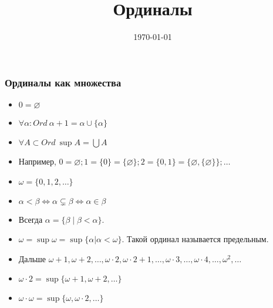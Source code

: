 \documentclass[10pt]{beamer}
\title{Ординалы}
\date{\today}
\begin{document}
\begin{frame}[plain]
    \maketitle
\end{frame}

\begin{frame}
    \frametitle{Ординалы как множества}
    \begin{itemize}
        \item $0 = \varnothing$
        \item $\forall \alpha : Ord~\alpha + 1 = \alpha \cup \{\alpha\}$
        \item $\forall A \subset Ord~\sup A = \bigcup A$
        \pause
        \item Например, $0 = \varnothing; 1 = \{0\} = \{\varnothing\}; 2 = \{0,1\} = \{\varnothing, \{\varnothing\}\}; \ldots$
        \item $\omega = \{0,1,2,\ldots\}$
        \pause
        \item $\alpha < \beta \Leftrightarrow \alpha \subsetneq \beta \Leftrightarrow \alpha \in \beta$
        \item Всегда $\alpha = \{\beta \mid \beta < \alpha\}$.
        \pause
        \item $\omega = \sup \omega = \sup \{\alpha | \alpha < \omega\}$. Такой ординал называется предельным.
        \item Дальше $\omega + 1, \omega + 2, \ldots, \omega \cdot 2, \omega \cdot 2 + 1, \ldots, \omega \cdot 3, \ldots, \omega \cdot 4, \ldots, \omega^2, \ldots$
        \item $\omega \cdot 2 = \sup \{\omega + 1, \omega +2, \ldots\}$
        \item $\omega \cdot \omega = \sup \{\omega, \omega \cdot 2, \ldots\}$
    \end{itemize}
\end{frame}
\end{document}
